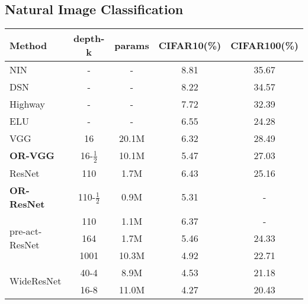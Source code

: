 \documentclass[10pt,twocolumn,letterpaper]{article}
\begin{document}
\subsection{Natural Image {Classification}}
    \begin{table}
        \begin{center}
        \footnotesize
        \setlength{\tabcolsep}{4pt}
        \begin{tabular}{|l|cccc|}
                \hline
                Method                           & depth-k & params & CIFAR10(\%)  & CIFAR100(\%)  \\ \hline\hline
                NIN \cite{Lin2014}                           & -       & -      & 8.81          & 35.67          \\
                DSN \cite{Lee2015}                           & -       & -      & 8.22          & 34.57          \\
                Highway \cite{Srivastava2015}                       & -       & -      & 7.72          & 32.39          \\
                ELU \cite{Clevert2015}                           & -       & -      & 6.55          & 24.28          \\ \hline
                VGG \cite{Simonyan2014}                           & 16      & 20.1M  & 6.32          & 28.49          \\ \hline
                \textbf{OR-VGG}                  & 16-$\tfrac{1}{2}$  & 10.1M  & 5.47          & 27.03          \\ \hline
                ResNet \cite{He2015}       & 110     & 1.7M   & 6.43          & 25.16          \\ \hline
                \textbf{OR-ResNet}               & 110-$\tfrac{1}{2}$ & 0.9M   & 5.31          & -              \\ \hline
                \multirow{3}{*}{pre-act-ResNet\cite{He2016}}   & 110     & 1.1M   & 6.37          & -              \\
                                                 & 164     & 1.7M      & 5.46          & 24.33          \\
                                                 & 1001    & 10.3M  & 4.92          & 22.71          \\ \hline
                \multirow{3}{*}{WideResNet\cite{Zagoruyko2016}}      & 40-4    & 8.9M   & 4.53          & 21.18          \\
                                                 & 16-8    & 11.0M  & 4.27          & 20.43          \\

\end{tabular}
\end{center}
\end{table}
\end{document}
